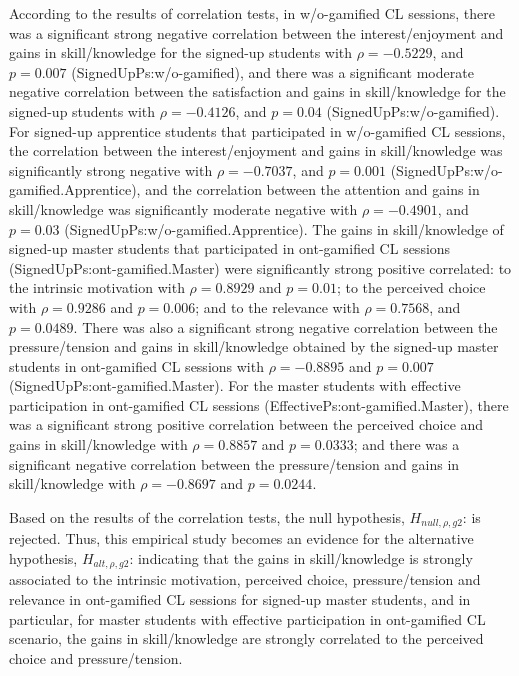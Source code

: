 According to the results of correlation tests, in w/o-gamified CL sessions, there was a significant strong negative correlation between the interest/enjoyment and gains in skill/knowledge for the signed-up students with $\rho = -0.5229$, and $p = 0.007$ (SignedUpPs:w/o-gamified), and there was a significant moderate negative correlation between the satisfaction and gains in skill/knowledge for the signed-up students with $\rho = -0.4126$, and $p = 0.04$ (SignedUpPs:w/o-gamified). For signed-up apprentice students that participated in w/o-gamified CL sessions, the correlation between the interest/enjoyment and gains in skill/knowledge was significantly strong negative with $\rho = -0.7037$, and $p = 0.001$ (SignedUpPs:w/o-gamified.Apprentice), and the correlation between the attention and gains in skill/knowledge was significantly moderate negative with $\rho = -0.4901$, and $p = 0.03$ (SignedUpPs:w/o-gamified.Apprentice). 
The gains in skill/knowledge of signed-up master students that participated in ont-gamified CL sessions (SignedUpPs:ont-gamified.Master) were significantly strong positive correlated: to the intrinsic motivation with $\rho = 0.8929$ and $p = 0.01$; to the perceived choice with $\rho = 0.9286$ and $p = 0.006$; and to the relevance with $\rho = 0.7568$, and $p = 0.0489$. There was also a significant strong negative correlation between the pressure/tension and gains in skill/knowledge obtained by the signed-up master students in ont-gamified CL sessions with $\rho = -0.8895$ and $p =0.007$ (SignedUpPs:ont-gamified.Master). For the master students with effective participation in ont-gamified CL sessions (EffectivePs:ont-gamified.Master), there was a significant strong positive correlation between the perceived choice and gains in skill/knowledge with $\rho = 0.8857$ and $p = 0.0333$; and there was a significant negative correlation between the pressure/tension and gains in skill/knowledge with $\rho = -0.8697$ and $p = 0.0244$.

Based on the results of the correlation tests, the null hypothesis, $H_{null,\rho,g2}$:  is rejected. Thus, this empirical study becomes an evidence for the alternative hypothesis, $H_{alt,\rho,g2}$:  indicating that the gains in skill/knowledge is strongly associated to the intrinsic motivation, perceived choice, pressure/tension and relevance in ont-gamified CL sessions for signed-up master students, and in particular, for master students with effective participation in ont-gamified CL scenario, the gains in skill/knowledge are strongly correlated to the perceived choice and pressure/tension.

